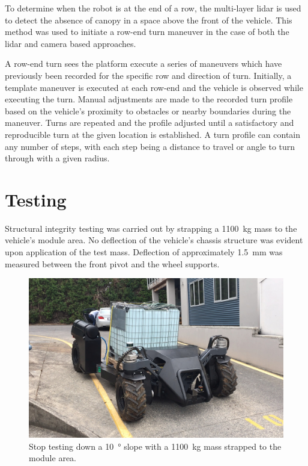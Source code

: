 \documentclass[preprint,authoryear,12pt]{elsarticle}
\begin{document}
    To determine when the robot is at the end of a row, the multi-layer lidar is used to detect the absence of canopy in a space above the front of the vehicle.
    This method was used to initiate a row-end turn maneuver in the case of both the lidar and camera based approaches.

    A row-end turn sees the platform execute a series of maneuvers which have previously been recorded for the specific row and direction of turn.
    Initially, a template maneuver is executed at each row-end and the vehicle is observed while executing the turn.
    Manual adjustments are made to the recorded turn profile based on the vehicle's proximity to obstacles or nearby boundaries during the maneuver.
    Turns are repeated and the profile adjusted until a satisfactory and reproducible turn at the given location is established.
    A turn profile can contain any number of steps, with each step being a distance to travel or angle to turn through with a given radius.


\section{Testing}
\label{sub:testing}


    Structural integrity testing was carried out by strapping a \SI{1100}{\kilo\gram} mass to the vehicle's module area.
    No deflection of the vehicle's chassis structure was evident upon application of the test mass.
    Deflection of approximately \SI{1.5}{\milli\meter} was measured between the front pivot and the wheel supports.

    \begin{figure}[htb]
        \centering
        \includegraphics[width=\linewidth]{imgs/photos/stopTesting.jpg}
        \caption{
            Stop testing down a \SI{10}{\degree} slope with a \SI{1100}{\kilo\gram} mass strapped to the module area.
        }
        \label{fig:suzy_testing}
    \end{figure}
\end{document}
